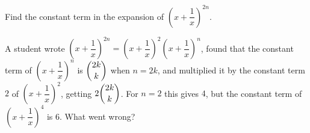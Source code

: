 Find the constant term in the expansion of $\left(x+\dfrac{1}{x}\right)^{2n}$.

A student wrote $\left(x+\dfrac{1}{x}\right)^{2n}=\left(x+\dfrac{1}{x}\right)^{2}\left(x+\dfrac{1}{x}\right)^{n}$, found that the constant term of $\left(x+\dfrac{1}{x}\right)^{n}$ is $\dbinom{2k}{k}$ when $n=2k$, and multiplied it by the constant term $2$ of $\left(x+\dfrac{1}{x}\right)^2$, getting $2\dbinom{2k}{k}$. For $n=2$ this gives $4$, but the constant term of $\left(x+\dfrac{1}{x}\right)^4$ is $6$. What went wrong?
